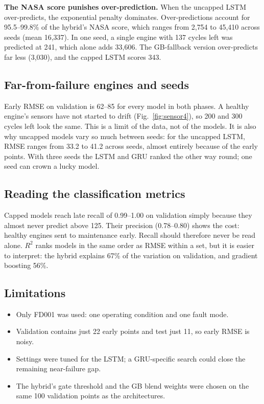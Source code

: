 \documentclass[conference]{IEEEtran}
\begin{document}
\textbf{The NASA score punishes over-prediction.} When the uncapped LSTM over-predicts, the exponential penalty dominates. Over-predictions account for 95.5--99.8\% of the hybrid's NASA score, which ranges from 2{,}754 to 45{,}410 across seeds (mean 16{,}337). In one seed, a single engine with 137 cycles left was predicted at 241, which alone adds 33{,}606. The GB-fallback version over-predicts far less (3{,}030), and the capped LSTM scores 343.

\subsection{Far-from-failure engines and seeds}
Early RMSE on validation is 62--85 for every model in both phases. A healthy engine's sensors have not started to drift (Fig.~\ref{fig:sensor4}), so 200 and 300 cycles left look the same. This is a limit of the data, not of the models. It is also why uncapped models vary so much between seeds: for the uncapped LSTM, RMSE ranges from 33.2 to 41.2 across seeds, almost entirely because of the early points. With three seeds the LSTM and GRU ranked the other way round; one seed can crown a lucky model.

\subsection{Reading the classification metrics}
Capped models reach late recall of 0.99--1.00 on validation simply because they almost never predict above 125. Their precision (0.78--0.80) shows the cost: healthy engines sent to maintenance early. Recall should therefore never be read alone. $R^2$ ranks models in the same order as RMSE within a set, but it is easier to interpret: the hybrid explains 67\% of the variation on validation, and gradient boosting 56\%.

\subsection{Limitations}
\begin{itemize}
  \item Only FD001 was used: one operating condition and one fault mode.
  \item Validation contains just 22 early points and test just 11, so early RMSE is noisy.
  \item Settings were tuned for the LSTM; a GRU-specific search could close the remaining near-failure gap.
  \item The hybrid's gate threshold and the GB blend weights were chosen on the same 100 validation points as the architectures.
\end{itemize}
\end{document}
